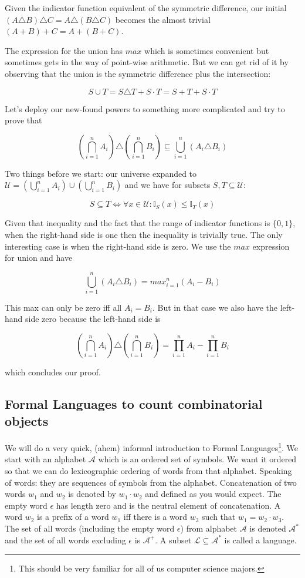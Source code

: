 Given the indicator function equivalent of the symmetric difference, our initial $(A \triangle B) \triangle C = A \triangle (B \triangle C)$ becomes the almost trivial ${(A + B) + C = A + (B + C)}$.

The expression for the union has $max$ which is sometimes convenient but sometimes gets in the way of point-wise arithmetic. But we can get rid of it by observing that the union is the symmetric difference plus the intersection:

$$
S \cup T = S \triangle T + S \cdot T = S + T + S \cdot T
$$
 
Let's deploy our new-found powers to something more complicated and try to prove that

$$
(\bigcap_{i = 1}^n A_i) \triangle (\bigcap_{i = 1}^n B_i) \subseteq \bigcup_{i = 1}^n (A_i \triangle B_i)
$$

Two things before we start: our universe expanded to ${\mathcal{U} = (\bigcup_{i = 1}^n A_i) \cup (\bigcup_{i = 1}^n B_i)}$ and we have for subsets $S, T \subseteq \mathcal{U}$:

$$
S \subseteq T \Leftrightarrow \forall x \in \mathcal{U}: \mathbb{I}_S(x) \leq \mathbb{I}_T(x)
$$

Given that inequality and the fact that the range of indicator functions is $\{0,1\}$, when the right-hand side is one then the inequality is trivially true. The only interesting case is when the right-hand side is zero. We use the $max$ expression for union and have 

$$
\bigcup_{i = 1}^n (A_i \triangle B_i) = max_{i = 1}^n (A_i - B_i)
$$

This max can only be zero iff all $A_i = B_i$. But in that case we also have the left-hand side zero because the left-hand side is

$$
(\bigcap_{i = 1}^n A_i) \triangle (\bigcap_{i = 1}^n B_i) = \prod_{i = 1}^n A_i - \prod_{i = 1}^n B_i
$$

which concludes our proof.

\subsection{Formal Languages to count combinatorial objects}

We will do a very quick, (ahem) informal introduction to Formal Languages\footnote{This should be very familiar for all of us computer science majors.}. We start with an alphabet $\mathcal{A}$ which is an ordered set of symbols. We want it ordered so that we can do lexicographic ordering of words from that alphabet. Speaking of words: they are sequences of symbols from the alphabet. Concatenation of two words $w_1$ and $w_2$ is denoted by $w_1 \cdot w_2$ and defined as you would expect. The empty word $\epsilon$ has length zero and is the neutral element of concatenation. A word $w_2$ is a prefix of a word $w_1$ iff there is a word $w_3$ such that $w_1 = w_2 \cdot w_3$. The set of all words (including the empty word $\epsilon$) from alphabet $\mathcal{A}$ is denoted $\mathcal{A}^*$ and the set of all words excluding $\epsilon$ is $\mathcal{A}^+$. A subset $\mathcal{L} \subseteq \mathcal{A}^*$ is called a language.

